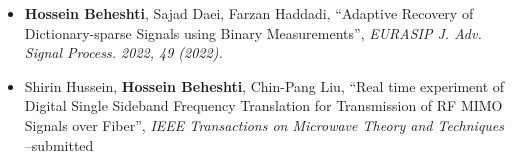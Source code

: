 
\begin{itemize}
	\item{
	            \textbf{Hossein Beheshti}, Sajad Daei, Farzan Haddadi, ``Adaptive Recovery of Dictionary-sparse Signals using Binary Measurements'',
	            \emph{EURASIP J. Adv. Signal Process. 2022, 49 (2022).}
	      }
	\item{
	            Shirin Hussein, \textbf{Hossein Beheshti}, Chin-Pang Liu, ``Real time experiment of Digital Single Sideband Frequency Translation for Transmission of RF MIMO Signals over Fiber'',
	            \emph{IEEE Transactions on Microwave Theory and Techniques} --submitted
	      }
\end{itemize}
